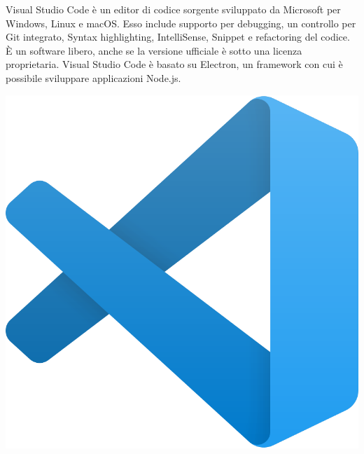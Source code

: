 \documentclass[twoside]{supsistudent}
\begin{document}
\bigskip
\noindent
\begin{minipage}[H]{0.49\textwidth} 
  \begin{flushleft}
    Visual Studio Code è un editor di codice sorgente sviluppato da Microsoft per Windows, Linux e macOS. Esso include supporto per debugging, 
    un controllo per Git integrato, Syntax highlighting, IntelliSense, Snippet e refactoring del codice. È un software libero, anche se la versione 
    ufficiale è sotto una licenza proprietaria. Visual Studio Code è basato su Electron, un framework con cui è possibile sviluppare applicazioni Node.js.
  \end{flushleft}
  \end{minipage}
\hfill
\begin{minipage}[H]{0.49\textwidth}
  \begin{center}
    \includegraphics[scale=0.1]{images/vscode.png}
  \end{center}
\end{minipage}
\end{document}
